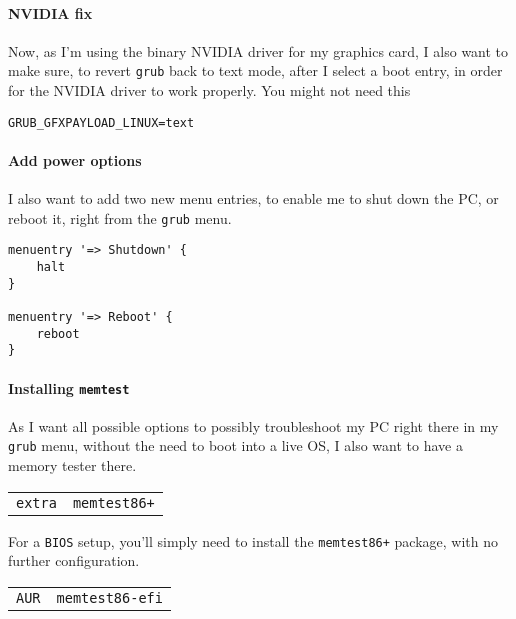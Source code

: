 \documentclass[9pt]{report}
\newenvironment{packagetable}
{\begin{longtabu}to \textwidth [b]{X[1,r]|X[1,l]}}
{\end{longtabu}}
\begin{document}
\newpage

\hypertarget{x-nvidia-fix}{\paragraph{NVIDIA fix}}
Now, as I’m using the binary NVIDIA driver for my graphics card, I also want to make sure, to revert \texttt{grub} back to text mode, after I select a boot entry, in order for the NVIDIA driver to work properly.
You might not need this


\begin{verbatim}
GRUB_GFXPAYLOAD_LINUX=text
\end{verbatim}


\newpage

\hypertarget{x-add-power-options}{\paragraph{Add power options}}
I also want to add two new menu entries, to enable me to shut down the PC, or reboot it, right from the \texttt{grub} menu.


\begin{verbatim}
menuentry '=> Shutdown' {
    halt
}

menuentry '=> Reboot' {
    reboot
}
\end{verbatim}


\newpage

\hypertarget{x-installing-memtest}{\paragraph{Installing \texttt{memtest}}}
As I want all possible options to possibly troubleshoot my PC right there in my \texttt{grub} menu,  without the need to boot into a live OS, I also want to have a memory tester there.


\begin{packagetable}
    \texttt{extra} & \texttt{memtest86+} \\ 
\end{packagetable}

For a \texttt{BIOS} setup, you’ll simply need to install the \texttt{memtest86+} package, with no further configuration.


\begin{packagetable}
    \texttt{AUR} & \texttt{memtest86-efi} \\ 
\end{packagetable}
\end{document}
